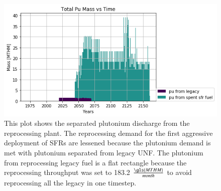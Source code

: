 \begin{figure}[htbp!]
	\begin{center}
		\includegraphics[scale=0.7]{./images/french-transition/pu.png}
	\end{center}
	\caption{This plot shows the separated plutonium discharge from the reprocessing plant.
			 The reprocessing demand for the first aggressive deployment of \glspl{SFR}
			 are lessened because the plutonium demand is met with plutonium separated from legacy \gls{UNF}.
			 The plutonium from reprocessing legacy fuel is a flat rectangle because the 
			 reprocessing throughput was set to 183.2 $\frac{\gls{MTHM}}{month}$ to avoid reprocessing
			 all the legacy in one timestep. }
	\label{fig:pu_no_cum}
\end{figure}

